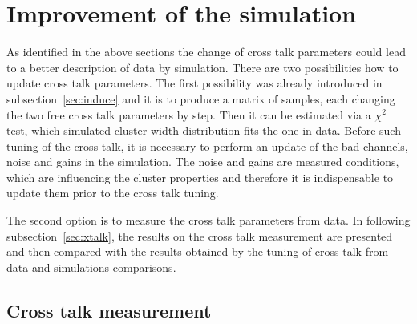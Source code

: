 
\newpage

\section{Improvement of the simulation}

As identified in the above sections the change of cross talk parameters could lead to a better description of data by simulation. There are two possibilities how to update cross talk parameters. The first possibility was already introduced in subsection~\ref{sec:induce} and it is to produce a matrix of samples, each changing the two free cross talk parameters by step. Then it can be estimated via a $\chi^{2}$ test, which simulated cluster width distribution fits the one in data. Before such tuning of the cross talk, it is necessary to perform an update of the bad channels, noise and gains in the simulation. The noise and gains are measured conditions, which are influencing the cluster properties and therefore it is indispensable to update them prior to the cross talk tuning.

The second option is to measure the cross talk parameters from data. In following subsection~\ref{sec:xtalk}, the results on the cross talk measurement are presented and then compared with the results obtained by the tuning of cross talk from data and simulations comparisons.



\subsection{Cross talk  measurement~\label{sec:xtalk}}

